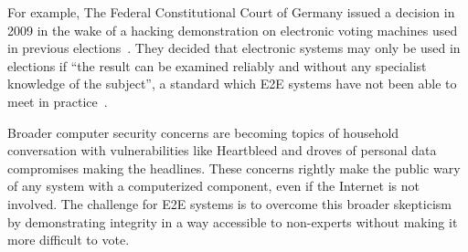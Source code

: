 For example, The Federal Constitutional Court of Germany issued a
decision in 2009 in the wake of a hacking demonstration on electronic
voting machines used in previous elections~\cite{germany2009decision}.
They decided that electronic systems may only be used in elections if
``the result can be examined reliably and without any specialist
knowledge of the subject'', a standard which E2E systems have not been
able to meet in practice~\cite{byrne2007usability}.

Broader computer security concerns are becoming topics of household
conversation with vulnerabilities like Heartbleed and droves of
personal data compromises making the headlines. These concerns rightly
make the public wary of any system with a computerized component, even
if the Internet is not involved. The challenge for E2E systems is to
overcome this broader skepticism by demonstrating integrity in a way
accessible to non-experts without making it more difficult to vote.


